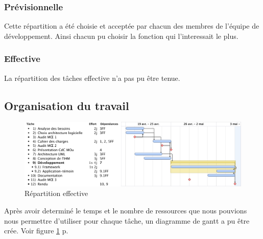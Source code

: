 \subsubsection{Prévisionnelle}

Cette répartition a été choisie et acceptée par chacun des membres de l'équipe de développement.
Ainsi chacun pu choisir la fonction qui l'interessait le plus.

\subsubsection{Effective}

La répartition des tâches effective n'a pas pu être tenue.

\subsection{Organisation du travail}
\begin{figure}[thbp]
	\centering
		\includegraphics[angle=90, scale=0.7]{../diagrammes/gantt_final.pdf}
	\caption{Répartition effective}
	\label{fig:repart_effect}
\end{figure}

Après avoir determiné le temps et le nombre de ressources que nous pouvions nous permettre d'utiliser pour chaque tâche, un diagramme de gantt a pu être crée. Voir figure  \ref{fig:repart_effect} p.\pageref{fig:repart_effect}
